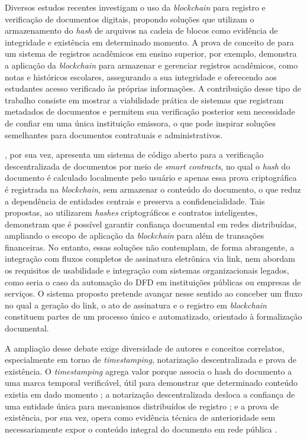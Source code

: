 \documentclass[
    12pt,
    a4paper,
    oneside,
    chapter=TITLE,
    section=TITLE,
    subsection=TITLE,
    subsubsection=TITLE,
    sumario=tradicional,
    english,
    brazil
]{abntex2}
\begin{document}
Diversos estudos recentes investigam o uso da \emph{blockchain} para
registro e verificação de documentos digitais, propondo soluções que
utilizam o armazenamento do \emph{hash} de arquivos na cadeia de
blocos como evidência de integridade e existência em determinado
momento. A prova de conceito de  para um
sistema de registros acadêmicos em ensino superior, por exemplo,
demonstra a aplicação da \emph{blockchain} para armazenar e gerenciar
registros acadêmicos, como notas e históricos escolares, assegurando a
sua integridade e oferecendo aos estudantes acesso verificado às
próprias informações. A contribuição desse tipo de
trabalho consiste em mostrar a viabilidade prática de sistemas que
registram metadados de documentos e permitem sua verificação
posterior sem necessidade de confiar em uma única instituição
emissora, o que pode inspirar soluções semelhantes para documentos
contratuais e administrativos.

, por sua vez, apresenta um sistema de código
aberto para a verificação descentralizada de documentos por meio de
\emph{smart contracts}, no qual o \emph{hash} do documento é calculado
localmente pelo usuário e apenas essa prova criptográfica é registrada
na \emph{blockchain}, sem armazenar o conteúdo do documento, o que
reduz a dependência de entidades centrais e preserva a
confidencialidade. Tais propostas, ao
utilizarem \emph{hashes} criptográficos e contratos inteligentes,
demonstram que é possível garantir confiança documental em redes
distribuídas, ampliando o escopo de aplicação da \emph{blockchain}
para além de transações financeiras. No entanto, essas soluções não
contemplam, de forma abrangente, a integração com fluxos completos de
assinatura eletrônica via link, nem abordam os requisitos de usabilidade
e integração com sistemas organizacionais legados, como seria o caso
da automação do DFD em instituições públicas ou empresas de serviços.
O sistema proposto pretende avançar nesse sentido ao conceber um
fluxo no qual a geração do link, o ato de assinatura e o registro em
\emph{blockchain} constituem partes de um processo único e
automatizado, orientado à formalização documental.

A ampliação desse debate exige diversidade de autores e conceitos
correlatos, especialmente em torno de \emph{timestamping}, notarização
descentralizada e prova de existência. O \emph{timestamping} agrega
valor porque associa o hash do documento a uma marca temporal
verificável, útil para demonstrar que determinado conteúdo existia em
dado momento \cite{haber1991}; a notarização descentralizada desloca a
confiança de uma entidade única para mecanismos distribuídos de
registro \cite{uikey2024}; e a prova de existência, por sua vez, opera
como evidência técnica de anterioridade sem necessariamente expor o
conteúdo integral do documento em rede pública \cite{sotnykov2025}.
\end{document}
